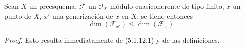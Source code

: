 \begin{proposition}[5.1.13]
\label{IV.2.5.1.13-fr}
Sean $X$ un preesquema, $\mathcal F$ un $\mathcal O_X$-módulo
cuasicoherente de tipo finito, $x$ un punto de $X$, $x'$ una generización de
$x$ en $X$; se tiene entonces
\begin{equation}
\dim(\mathcal F_{x'})\leq\dim(\mathcal F_x)
\tag{5.1.13.1}\label{IV.2.5.1.13.1-fr}
\end{equation}
\end{proposition}

\begin{proof}
Esto resulta inmediatamente de (5.1.12.1) y de las definiciones.
\end{proof}
